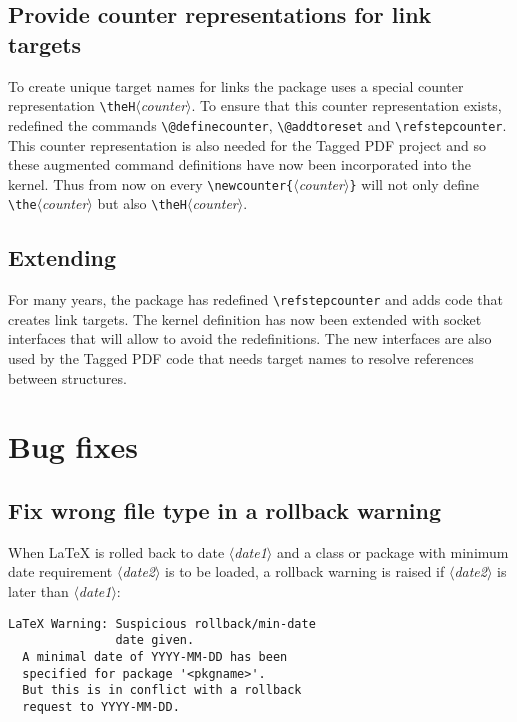 \documentclass{ltnews}
\providecommand\meta[1]{$\langle$\textrm{\itshape#1}$\rangle$}
\begin{document}
\subsection{Provide counter representations for link targets}

To create unique target names for links the package 
uses a special counter representation \verb+\theH+\meta{counter}. To
ensure that this counter representation exists, 
redefined the commands \verb+\@definecounter+, \verb+\@addtoreset+ and
\verb+\refstepcounter+. This counter representation is also needed for
the Tagged PDF project and so these augmented command definitions
have now been incorporated into the kernel.  Thus from now on every
\verb+\newcounter{+\meta{counter}\verb+}+ will not only define
\verb+\the+\meta{counter} but also \verb+\theH+\meta{counter}.

\subsection{Extending }

For many years, the package  has redefined
\verb+\refstepcounter+ and adds code that creates link targets. The
kernel definition has now been extended with socket interfaces that
will allow  to avoid the redefinitions. The new
interfaces are also used by the Tagged PDF code that needs target
names to resolve references between structures.


\section{Bug fixes}

\subsection{Fix wrong file type in a rollback warning}

When \LaTeX{} is rolled back to date \meta{date1} and a class or
package with minimum date requirement \meta{date2} is to be loaded, a
rollback warning is raised if \meta{date2} is later than \meta{date1}:
\begin{verbatim}
LaTeX Warning: Suspicious rollback/min-date
               date given.
  A minimal date of YYYY-MM-DD has been
  specified for package '<pkgname>'.
  But this is in conflict with a rollback
  request to YYYY-MM-DD.
\end{verbatim}
\end{document}
